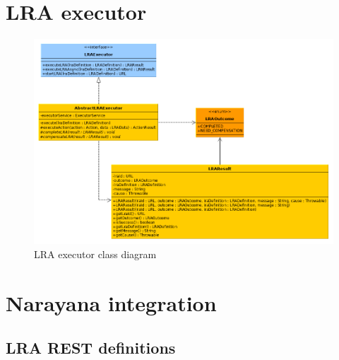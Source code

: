 \documentclass[oneside,
  digital, %
  table,   %
  lof,     %
  lot,     %
]{fithesis3}
\begin{document}
\clearpage

\section{LRA executor}

\hfill \break

\begin{figure}[h]
    \begin{center}
        \includegraphics[trim=5cm 0 0 -2cm,width=1.2\textwidth]{images/classDiagrams/lra-executor.png}
    \end{center}
    \caption{LRA executor class diagram}
    \label{fig:lra-executor-class-diagram}
\end{figure}

\clearpage

\section{Narayana integration}

\subsection{LRA REST definitions}
\end{document}
